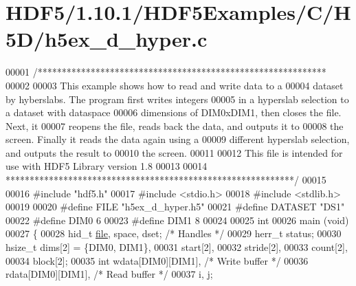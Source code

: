 \hypertarget{_h_d_f5_21_810_81_2_h_d_f5_examples_2_c_2_h5_d_2h5ex__d__hyper_8c_source}{}\section{H\+D\+F5/1.10.1/\+H\+D\+F5\+Examples/\+C/\+H5\+D/h5ex\+\_\+d\+\_\+hyper.c}
\label{_h_d_f5_21_810_81_2_h_d_f5_examples_2_c_2_h5_d_2h5ex__d__hyper_8c_source}

\begin{DoxyCode}
00001 \textcolor{comment}{/************************************************************}
00002 \textcolor{comment}{}
00003 \textcolor{comment}{  This example shows how to read and write data to a}
00004 \textcolor{comment}{  dataset by hyberslabs.  The program first writes integers}
00005 \textcolor{comment}{  in a hyperslab selection to a dataset with dataspace}
00006 \textcolor{comment}{  dimensions of DIM0xDIM1, then closes the file.  Next, it}
00007 \textcolor{comment}{  reopens the file, reads back the data, and outputs it to}
00008 \textcolor{comment}{  the screen.  Finally it reads the data again using a}
00009 \textcolor{comment}{  different hyperslab selection, and outputs the result to}
00010 \textcolor{comment}{  the screen.}
00011 \textcolor{comment}{}
00012 \textcolor{comment}{  This file is intended for use with HDF5 Library version 1.8}
00013 \textcolor{comment}{}
00014 \textcolor{comment}{ ************************************************************/}
00015 
00016 \textcolor{preprocessor}{#include "hdf5.h"}
00017 \textcolor{preprocessor}{#include <stdio.h>}
00018 \textcolor{preprocessor}{#include <stdlib.h>}
00019 
00020 \textcolor{preprocessor}{#define FILE            "h5ex\_d\_hyper.h5"}
00021 \textcolor{preprocessor}{#define DATASET         "DS1"}
00022 \textcolor{preprocessor}{#define DIM0            6}
00023 \textcolor{preprocessor}{#define DIM1            8}
00024 
00025 \textcolor{keywordtype}{int}
00026 main (\textcolor{keywordtype}{void})
00027 \{
00028     hid\_t       \hyperlink{structfile}{file}, space, dset;          \textcolor{comment}{/* Handles */}
00029     herr\_t      status;
00030     hsize\_t     dims[2] = \{DIM0, DIM1\},
00031                 start[2],
00032                 stride[2],
00033                 count[2],
00034                 block[2];
00035     \textcolor{keywordtype}{int}         wdata[DIM0][DIM1],          \textcolor{comment}{/* Write buffer */}
00036                 rdata[DIM0][DIM1],          \textcolor{comment}{/* Read buffer */}
00037                 i, j;

\end{DoxyCode}
